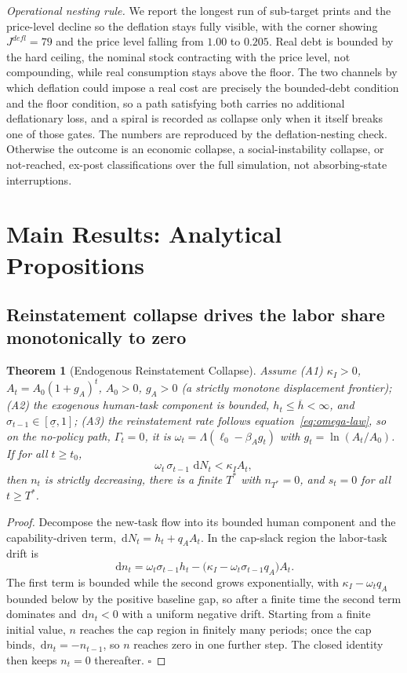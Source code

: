 \documentclass[review,12pt]{elsarticle}
\theoremstyle{plain}
\newtheorem{theorem}{Theorem}
\theoremstyle{definition}
\theoremstyle{remark}
\newcommand{\dd}{\,\mathrm{d}}
\begin{document}
\smallskip\noindent\emph{Operational nesting rule.} We report the longest run of sub-target prints and the price-level decline so the deflation stays fully visible, with the corner showing $J^{defl}=79$ and the price level falling from $1.00$ to $0.205$. Real debt is bounded by the hard ceiling, the nominal stock contracting with the price level, not compounding, while real consumption stays above the floor. The two channels by which deflation could impose a real cost are precisely the bounded-debt condition and the floor condition, so a path satisfying both carries no additional deflationary loss, and a spiral is recorded as collapse only when it itself breaks one of those gates. The numbers are reproduced by the deflation-nesting check. Otherwise the outcome is an economic collapse, a social-instability collapse, or not-reached, ex-post classifications over the full simulation, not absorbing-state interruptions.

\section{Main Results: Analytical Propositions}
\label{sec:main-results}
\subsection{Reinstatement collapse drives the labor share monotonically to zero}
\begin{theorem}[Endogenous Reinstatement Collapse]
\label{thm1}
Assume (A1) $\kappa_I>0$, $A_t=A_0(1+g_A)^t$, $A_0>0$, $g_A>0$ (a strictly monotone displacement frontier); (A2) the exogenous human-task component is bounded, $h_t\le\overline h<\infty$, and $\sigma_{t-1}\in[\underline{\sigma},1]$; (A3) the reinstatement rate follows equation~\eqref{eq:omega-law}, so on the no-policy path, $\Gamma_t=0$, it is $\omega_t=\Lambda(\ell_0-\beta_A g_t)$ with $g_t=\ln(A_t/A_0)$. If for all $t\ge t_0$,
\[
\omega_t\,\sigma_{t-1}\,\dd N_t<\kappa_I A_t,
\]
then $n_t$ is strictly decreasing, there is a finite $T^*$ with $n_{T^*}=0$, and $s_t=0$ for all $t\ge T^*$.
\end{theorem}
\begin{proof}
Decompose the new-task flow into its bounded human component and the capability-driven term, $\dd N_t=h_t+q_A A_t$. In the cap-slack region the labor-task drift is
\[
\dd n_t=\omega_t\sigma_{t-1}h_t-\bigl(\kappa_I-\omega_t\sigma_{t-1}q_A\bigr)A_t.
\]
The first term is bounded while the second grows exponentially, with $\kappa_I-\omega_t q_A$ bounded below by the positive baseline gap, so after a finite time the second term dominates and $\dd n_t<0$ with a uniform negative drift. Starting from a finite initial value, $n$ reaches the cap region in finitely many periods; once the cap binds, $\dd n_t=-n_{t-1}$, so $n$ reaches zero in one further step. The closed identity then keeps $n_t=0$ thereafter. $\square$
\end{proof}
\end{document}
